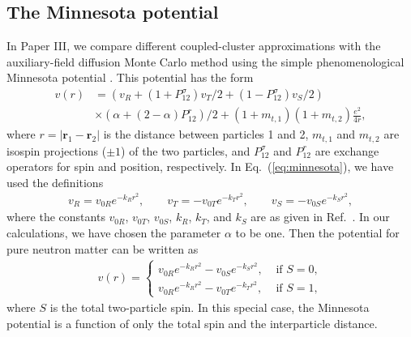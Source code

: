 \documentclass[a4paper,12pt]{report}
\begin{document}
\subsection{The Minnesota potential}

In Paper III, we compare different coupled-cluster 
approximations with the auxiliary-field diffusion Monte 
Carlo method using the simple phenomenological Minnesota 
potential \cite{thompson1977}. This potential has the form
\begin{align} \label{eq:minnesota}
  v(r) &= \left( v_{R} + \left( 1 
  + P_{12}^{\sigma }\right)v_{T}/2 + \left( 
  1 - P_{12}^{\sigma }\right) v_{S}/2\right) \nonumber \\
  & \times \left( \alpha 
  + \left( 2-\alpha \right) P_{12}^{r}\right) /2 
  + \left( 1 + m_{t,1}\right) \left( 1 
  + m_{t,2}\right) \frac{e^{2}}{4r},
\end{align}
where $r = |\mathbf{r}_{1}-\mathbf{r}_{2}|$ is the distance
between particles 1 and 2, $m_{t,1}$ and $m_{t,2}$ are 
isospin projections ($\pm 1$) of the two particles, and 
$P_{12}^{\sigma }$ and $P_{12}^{r}$ are exchange operators 
for spin and position, respectively. In 
Eq.~(\ref{eq:minnesota}), we have used the definitions
\begin{align}
  v_{R} = v_{0R}e^{-k_{R}r^{2}}, \qquad v_{T} = 
  - v_{0T}e^{-k_{T}r^{2}}, \qquad v_{S} = -v_{0S}e^{-k_{S}r^{2}},
\end{align} 
where the constants $v_{0R}$, $v_{0T}$, $v_{0S}$, $k_{R}$,
$k_{T}$, and $k_{S}$ are as given in Ref.~\cite{thompson1977}.
In our calculations, we have chosen the parameter $\alpha $ 
to be one. Then the potential for pure neutron matter 
can be written as
\begin{align}
  v(r) = \left\{ \begin{array}{ll}
    v_{0R}e^{-k_{R}r^{2}} - v_{0S}e^{-k_{S}r^{2}}, & \text{ if } S = 0, \\
    v_{0R}e^{-k_{R}r^{2}} - v_{0T}e^{-k_{T}r^{2}}, & \text{ if } S = 1,
  \end{array} \right.
\end{align}
where $S$ is the total two-particle spin. In this special 
case, the Minnesota potential is a function of only the total 
spin and the interparticle distance.


\end{document}
